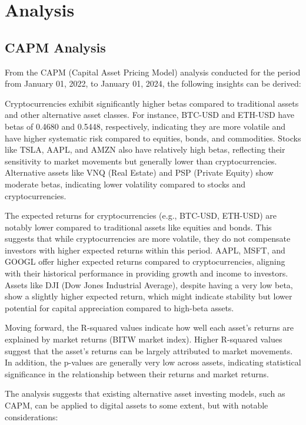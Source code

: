 \section{Analysis}
\subsection{CAPM Analysis}

From the CAPM (Capital Asset Pricing Model) analysis conducted for the period from January 01, 2022, to January 01, 2024, the following insights can be derived:

Cryptocurrencies exhibit significantly higher betas compared to traditional assets and other alternative asset classes. For instance, BTC-USD and ETH-USD have betas of 0.4680 and 0.5448, respectively, indicating they are more volatile and have higher systematic risk compared to equities, bonds, and commodities. Stocks like TSLA, AAPL, and AMZN also have relatively high betas, reflecting their sensitivity to market movements but generally lower than cryptocurrencies. Alternative assets like VNQ (Real Estate) and PSP (Private Equity) show moderate betas, indicating lower volatility compared to stocks and cryptocurrencies.

The expected returns for cryptocurrencies (e.g., BTC-USD, ETH-USD) are notably lower compared to traditional assets like equities and bonds. This suggests that while cryptocurrencies are more volatile, they do not compensate investors with higher expected returns within this period. AAPL, MSFT, and GOOGL offer higher expected returns compared to cryptocurrencies, aligning with their historical performance in providing growth and income to investors. Assets like DJI (Dow Jones Industrial Average), despite having a very low beta, show a slightly higher expected return, which might indicate stability but lower potential for capital appreciation compared to high-beta assets.

Moving forward, the R-squared values indicate how well each asset's returns are explained by market returns (BITW market index). Higher R-squared values suggest that the asset's returns can be largely attributed to market movements. In addition, the p-values are generally very low across assets, indicating statistical significance in the relationship between their returns and market returns.

The analysis suggests that existing alternative asset investing models, such as CAPM, can be applied to digital assets to some extent, but with notable considerations:

